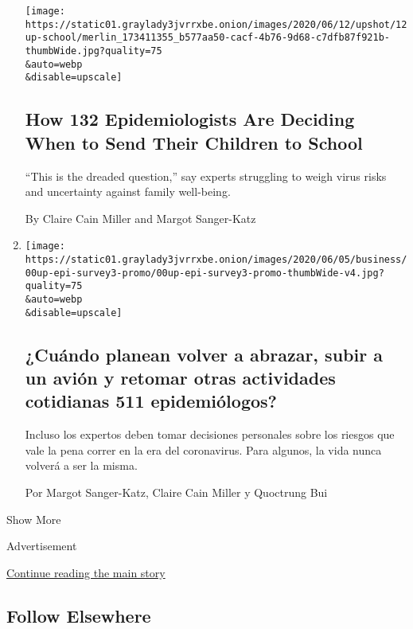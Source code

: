 \begin{enumerate}
  \texttt{[image: https://static01.graylady3jvrrxbe.onion/images/2020/06/12/upshot/12up-school/merlin\_173411355\_b577aa50-cacf-4b76-9d68-c7dfb87f921b-thumbWide.jpg?quality=75\\\&auto=webp\\\&disable=upscale]}

  \hypertarget{how-132-epidemiologists-are-deciding-when-to-send-their-children-to-school}{%
  \subsection{How 132 Epidemiologists Are Deciding When to Send Their
  Children to
  School}\label{how-132-epidemiologists-are-deciding-when-to-send-their-children-to-school}}

  ``This is the dreaded question,'' say experts struggling to weigh
  virus risks and uncertainty against family well-being.

  By Claire Cain Miller and Margot Sanger-Katz
\item
  \href{/es/interactive/2020/06/10/espanol/ciencia-y-tecnologia/epidemiologos-recomendaciones-normalidad.html}{}

  \texttt{[image: https://static01.graylady3jvrrxbe.onion/images/2020/06/05/business/00up-epi-survey3-promo/00up-epi-survey3-promo-thumbWide-v4.jpg?quality=75\\\&auto=webp\\\&disable=upscale]}

  \hypertarget{cuuxe1ndo-planean-volver-a-abrazar-subir-a-un-aviuxf3n-y-retomar-otras-actividades-cotidianas-511-epidemiuxf3logos}{%
  \subsection{¿Cuándo planean volver a abrazar, subir a un avión y
  retomar otras actividades cotidianas 511
  epidemiólogos?}\label{cuuxe1ndo-planean-volver-a-abrazar-subir-a-un-aviuxf3n-y-retomar-otras-actividades-cotidianas-511-epidemiuxf3logos}}

  Incluso los expertos deben tomar decisiones personales sobre los
  riesgos que vale la pena correr en la era del coronavirus. Para
  algunos, la vida nunca volverá a ser la misma.

  Por Margot Sanger-Katz, Claire Cain Miller y Quoctrung Bui
\end{enumerate}

Show More

Advertisement

\protect\hyperlink{after-mid2}{Continue reading the main story}

\hypertarget{follow-elsewhere}{%
\subsection{Follow Elsewhere}\label{follow-elsewhere}}

